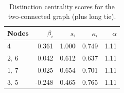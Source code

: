 \begin{table}
\centering
\caption{\label{tab:tcl}Distinction centrality scores for the two-connected graph (plus long tie).}
\centering
\begin{tabular}[t]{lrrrr}
\toprule
Nodes & $\beta_i$ & $s_i$ & $\kappa_i$ & $\alpha$\\
\midrule
4 & 0.361 & 1.000 & 0.749 & 1.11\\
2, 6 & 0.042 & 0.612 & 0.637 & 1.11\\
1, 7 & 0.025 & 0.654 & 0.701 & 1.11\\
3, 5 & -0.248 & 0.465 & 0.765 & 1.11\\
\bottomrule
\end{tabular}
\end{table}
